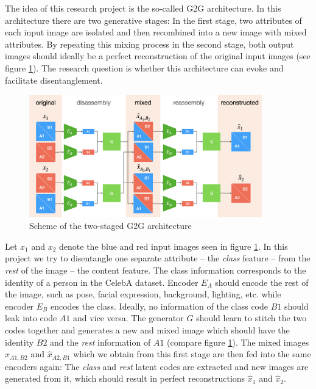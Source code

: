 \documentclass[conference]{IEEEtran}
\begin{document}
The idea of this research project is the so-called G2G architecture. In this architecture there are two generative stages: In the first stage, two attributes of each input image are isolated and then recombined into a new image with mixed attributes. By repeating this mixing process in the second stage, both output images should ideally be a perfect reconstruction of the original input images (see figure \ref{fig:g2g_arch}). The research question is whether this architecture can evoke and facilitate disentanglement.

\begin{figure}[h!]
	\centering
	\includegraphics[width=0.9\textwidth]{figures/g2g_arch.png}
	\caption{Scheme of the two-staged G2G architecture}
	\label{fig:g2g_arch}
\end{figure}

Let $x_1$ and $x_2$ denote the blue and red input images seen in figure \ref{fig:g2g_arch}. In this project we try to disentangle one separate attribute -- the \textit{class} feature -- from the \textit{rest} of the image -- the content feature. The class information corresponds to the identity of a person in the CelebA dataset. Encoder $E_A$ should encode the rest of the image, such as pose, facial expression, background, lighting, etc. while encoder $E_B$ encodes the class. Ideally, no information of the class code $B1$ should leak into code $A1$ and vice versa. The generator $G$ should learn to stitch the two codes together and generates a new and mixed image which should have the identity $B2$ and the \textit{rest} information of $A1$ (compare figure \ref{fig:g2g_arch}). The mixed images $\hat{x}_{A1,B2}$ and $\hat{x}_{A2,B1}$ which we obtain from this first stage are then fed into the same encoders again: The \textit{class} and \textit{rest} latent codes are extracted and new images are generated from it, which should result in perfect reconstructions $\hat{x}_1$ and $\hat{x}_2$.
\end{document}
